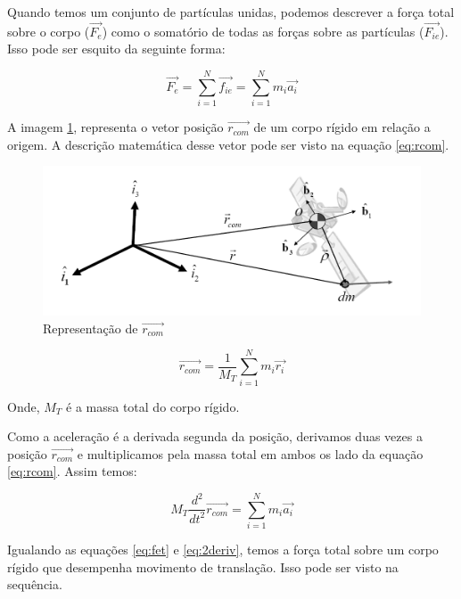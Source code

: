 Quando temos um conjunto de partículas unidas, podemos descrever a força total sobre o corpo ($\vec{F_e}$) como o somatório de todas as forças sobre as partículas ($\vec{F_{ie}}$). Isso pode ser esquito da seguinte forma:

\begin{equation}\label{eq:fet}
  \vec{F_{e}}=\sum_{i=1}^{N}{\vec{f_{ie}}}=\sum_{i=1}^{N}{m_i\vec{a_i}} 
\end{equation}

A imagem \ref{fig:translacao_referencial_snider_p15}, representa o vetor posição $\vec{r_{com}}$ de um corpo rígido em relação a origem. A descrição matemática desse vetor pode ser visto na equação \ref{eq:rcom}.

\begin{figure}[!ht]
  \caption{Representação de $\vec{r_{com}}$}
  \begin{center}
      \includegraphics[scale=0.5]{img/translacao_referencial_snider_p15}
  \end{center}
  \label{fig:translacao_referencial_snider_p15}
\end{figure}

\begin{equation}\label{eq:rcom}
  \vec{r_{com}}=\frac{1}{M_T}\sum_{i=1}^{N}{m_i\vec{r_i}} 
\end{equation}

Onde, $M_T$ é a massa total do corpo rígido.

Como a aceleração é a derivada segunda da posição, derivamos duas vezes a posição $\vec{r_{com}}$ e multiplicamos pela massa total em ambos os lado da equação \ref{eq:rcom}. Assim temos:

\begin{equation}\label{eq:2deriv}
  M_T\frac{{d}^{2}}{{d}t^{2}}\vec{r_{com}}=\sum_{i=1}^{N}{m_i\vec{a_i}}
\end{equation}

Igualando as equações \ref{eq:fet} e \ref{eq:2deriv}, temos a força total sobre um corpo rígido que desempenha movimento de translação. Isso pode ser visto na sequência.

